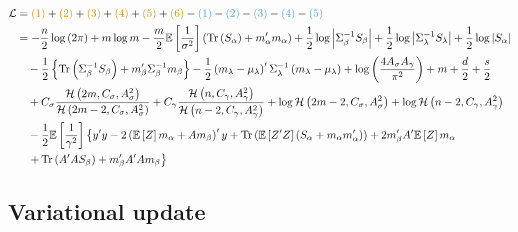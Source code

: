 \documentclass[11pt]{article}
\DeclareMathOperator{\Tr}{Tr}
\begin{document}
\begin{align*}
  \mathcal{L} &= \textcolor{myorange}{(1)} + \textcolor{myorange}{(2)} + \textcolor{myorange}{(3)} + \textcolor{myorange}{(4)} + \textcolor{myorange}{(5)} + \textcolor{myorange}{(6)} - \textcolor{myblue}{(1)} - \textcolor{myblue}{(2)} - \textcolor{myblue}{(3)} - \textcolor{myblue}{(4)} - \textcolor{myblue}{(5)}\\
  &= -\frac{n}{2}\log\left(2\pi\right) +m\log m -\frac{m}{2}\mathbb{E}\left[\frac{1}{\sigma^{2}}\right]\left(\Tr\left(S_{\alpha}\right)+m_{\alpha}'m_{\alpha}\right)+\frac{1}{2}\log\left|\Sigma_{\beta}^{-1}S_{\beta}\right|+\frac{1}{2}\log \left|\Sigma_{\lambda}^{-1}S_{\lambda}\right|+\frac{1}{2}\log\left|S_{\alpha}\right| \\
  &\quad -\frac{1}{2}\left\{\Tr \left(\Sigma_{\beta}^{-1}S_{\beta}\right)+m_{\beta}'\Sigma_{\beta}^{-1}m_{\beta} \right\} -\frac{1}{2}\left(m_{\lambda}-\mu_{\lambda}\right)'\Sigma_{\lambda}^{-1}\left(m_{\lambda}-\mu_{\lambda}\right)+\log \left(\frac{4A_{\sigma}A_{\gamma}}{\pi^{2}}\right)+m+\frac{d}{2}+\frac{s}{2}\\
  &\quad +C_{\sigma}\frac{\mathcal{H}\left(2m, C_{\sigma}, A_{\sigma}^{2}\right)}{\mathcal{H}\left(2m-2, C_{\sigma}, A_{\sigma}^{2}\right)} +C_{\gamma}\frac{\mathcal{H}\left(n, C_{\gamma}, A_{\gamma}^{2}\right)}{\mathcal{H}\left(n-2, C_{\gamma}, A_{\gamma}^{2}\right)} +\log \mathcal{H}\left(2m-2, C_{\sigma}, A_{\sigma}^{2}\right) + \log \mathcal{H}\left(n-2, C_{\gamma}, A_{\gamma}^{2}\right)\\
  &\quad -\frac{1}{2}\mathbb{E}\left[\frac{1}{\gamma^{2}}\right]\left\{y'y -2\left(\mathbb{E}\left[Z\right]m_{\alpha}+Am_{\beta}\right)'y +\Tr\left(\mathbb{E}\left[Z'Z\right]\left(S_{\alpha}+m_{\alpha}m_{\alpha}'\right)\right) +2m_{\beta}'A'\mathbb{E}\left[Z\right]m_{\alpha}\right.\\
  &\quad \left. +\Tr\left(A'AS_{\beta}\right) +m_{\beta}'A'Am_{\beta} \right\}
\end{align*}
\subsection{Variational update}
\end{document}
